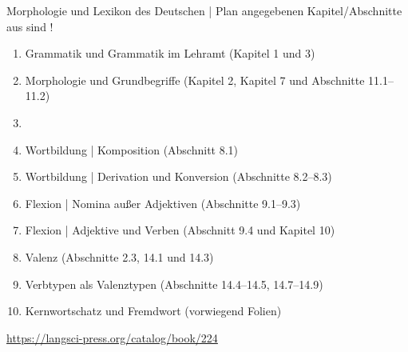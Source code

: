   \begin{frame}
    {Morphologie und Lexikon des Deutschen | Plan}
     angegebenen Kapitel\slash Abschnitte aus  sind !\\
    \Halbzeile
    \begin{enumerate}
      \item Grammatik und Grammatik im Lehramt (Kapitel 1 und 3)
      \item Morphologie und Grundbegriffe (Kapitel 2, Kapitel 7 und Abschnitte 11.1--11.2)
      \item {}
      \item Wortbildung | Komposition (Abschnitt 8.1)
      \item Wortbildung | Derivation und Konversion (Abschnitte 8.2--8.3)
      \item Flexion | Nomina außer Adjektiven (Abschnitte 9.1--9.3)
      \item Flexion | Adjektive und Verben (Abschnitt 9.4 und Kapitel 10)
      \item Valenz (Abschnitte 2.3, 14.1 und 14.3)
      \item Verbtypen als Valenztypen (Abschnitte 14.4--14.5, 14.7--14.9) 
      \item Kernwortschatz und Fremdwort (vorwiegend Folien)
    \end{enumerate}
    \Halbzeile
    \centering 
    \url{https://langsci-press.org/catalog/book/224}
  \end{frame}

\fi
